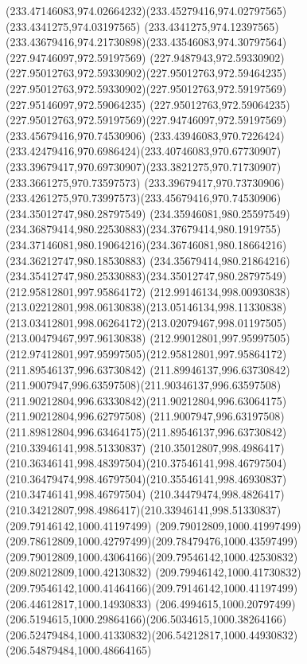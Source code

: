 {    \curveto(233.47146083,974.02664232)(233.45279416,974.02797565)(233.4341275,974.03197565)
    \curveto(233.4341275,974.12397565)(233.43679416,974.21730898)(233.43546083,974.30797564)
    \moveto(227.94746097,972.59197569)
    \curveto(227.9487943,972.59330902)(227.95012763,972.59330902)(227.95012763,972.59464235)
    \curveto(227.95012763,972.59330902)(227.95012763,972.59197569)(227.95146097,972.59064235)
    \curveto(227.95012763,972.59064235)(227.95012763,972.59197569)(227.94746097,972.59197569)
    \moveto(233.45679416,970.74530906)
    \curveto(233.43946083,970.7226424)(233.42479416,970.6986424)(233.40746083,970.67730907)
    \curveto(233.39679417,970.69730907)(233.3821275,970.71730907)(233.3661275,970.73597573)
    \curveto(233.39679417,970.73730906)(233.4261275,970.73997573)(233.45679416,970.74530906)
    \moveto(234.35012747,980.28797549)
    \curveto(234.35946081,980.25597549)(234.36879414,980.22530883)(234.37679414,980.1919755)
    \curveto(234.37146081,980.19064216)(234.36746081,980.18664216)(234.36212747,980.18530883)
    \curveto(234.35679414,980.21864216)(234.35412747,980.25330883)(234.35012747,980.28797549)
    \moveto(212.95812801,997.95864172)
    \curveto(212.99146134,998.00930838)(213.02212801,998.06130838)(213.05146134,998.11330838)
    \curveto(213.03412801,998.06264172)(213.02079467,998.01197505)(213.00479467,997.96130838)
    \curveto(212.99012801,997.95997505)(212.97412801,997.95997505)(212.95812801,997.95864172)
    \moveto(211.89546137,996.63730842)
    \curveto(211.89946137,996.63730842)(211.9007947,996.63597508)(211.90346137,996.63597508)
    \curveto(211.90212804,996.63330842)(211.90212804,996.63064175)(211.90212804,996.62797508)
    \curveto(211.9007947,996.63197508)(211.89812804,996.63464175)(211.89546137,996.63730842)
    \moveto(210.33946141,998.51330837)
    \curveto(210.35012807,998.4986417)(210.36346141,998.48397504)(210.37546141,998.46797504)
    \curveto(210.36479474,998.46797504)(210.35546141,998.46930837)(210.34746141,998.46797504)
    \curveto(210.34479474,998.4826417)(210.34212807,998.4986417)(210.33946141,998.51330837)
    \moveto(209.79146142,1000.41197499)
    \curveto(209.79012809,1000.41997499)(209.78612809,1000.42797499)(209.78479476,1000.43597499)
    \curveto(209.79012809,1000.43064166)(209.79546142,1000.42530832)(209.80212809,1000.42130832)
    \curveto(209.79946142,1000.41730832)(209.79546142,1000.41464166)(209.79146142,1000.41197499)
    \moveto(206.44612817,1000.14930833)
    \curveto(206.4994615,1000.20797499)(206.5194615,1000.29864166)(206.5034615,1000.38264166)
    \curveto(206.52479484,1000.41330832)(206.54212817,1000.44930832)(206.54879484,1000.48664165)
}
